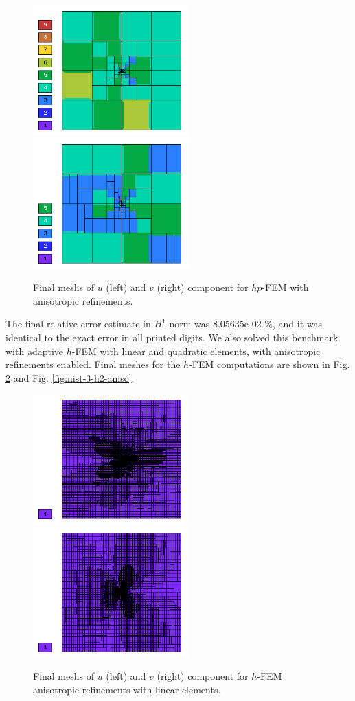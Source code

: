 \begin{figure}[!ht]
\centering
\includegraphics[height=5cm]{nist/nist-3/mesh_u_hp_anisoh.png}\ \
\includegraphics[height=5cm]{nist/nist-3/mesh_v_hp_anisoh.png}
\caption{Final meshs of $u$ (left) and $v$ (right) component for $hp$-FEM with anisotropic refinements.}
\label{fig:nist-3-hp-aniso}
\end{figure}

The final relative error estimate in $H^1$-norm was 8.05635e-02 \%,
and it was identical to the exact error in all printed digits.
We also solved this benchmark with adaptive $h$-FEM
with linear and quadratic elements, with anisotropic refinements enabled.
Final meshes for the $h$-FEM computations are shown
in Fig. \ref{fig:nist-3-h1-aniso} and Fig. \ref{fig:nist-3-h2-aniso}.

\begin{figure}[!ht]
\centering
\includegraphics[height=5cm]{nist/nist-3/mesh_u_h1_aniso.png}\ \
\includegraphics[height=5cm]{nist/nist-3/mesh_v_h1_aniso.png}
\caption{Final meshs of $u$ (left) and $v$ (right) component for $h$-FEM anisotropic refinements with linear elements.}
\label{fig:nist-3-h1-aniso}
\end{figure}


